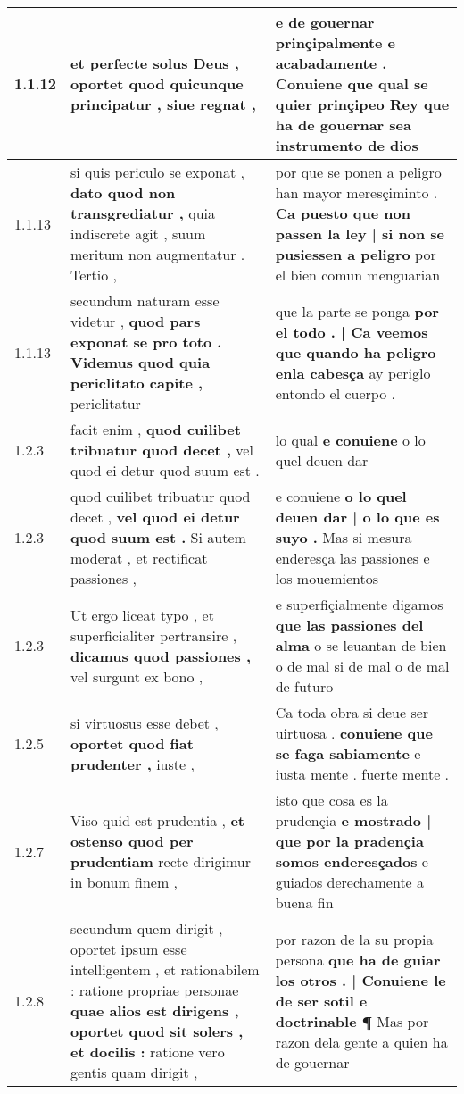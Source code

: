 \begin{tabular}{|p{1cm}|p{6.5cm}|p{6.5cm}|}
1.1.12 & et perfecte solus Deus , \textbf{ oportet quod quicunque principatur , } siue regnat , & e de gouernar prinçipalmente e acabadamente . \textbf{ Conuiene que qual se quier prinçipeo Rey } que ha de gouernar sea instrumento de dios \\\hline
1.1.13 & si quis periculo se exponat , \textbf{ dato quod non transgrediatur , } quia indiscrete agit , suum meritum non augmentatur . Tertio , & por que se ponen a peligro han mayor meresçiminto . \textbf{ Ca puesto que non passen la ley | si non se pusiessen a peligro } por el bien comun menguarian \\\hline
1.1.13 & secundum naturam esse videtur , \textbf{ quod pars exponat se pro toto . Videmus quod quia periclitato capite , } periclitatur & que la parte se ponga \textbf{ por el todo . | Ca veemos que quando ha peligro enla cabesça } ay periglo entondo el cuerpo . \\\hline
1.2.3 & facit enim , \textbf{ quod cuilibet tribuatur quod decet , } vel quod ei detur quod suum est . & lo qual \textbf{ e conuiene } o lo quel deuen dar \\\hline
1.2.3 & quod cuilibet tribuatur quod decet , \textbf{ vel quod ei detur quod suum est . } Si autem moderat , et rectificat passiones , & e conuiene \textbf{ o lo quel deuen dar | o lo que es suyo . } Mas si mesura enderesça las passiones e los mouemientos \\\hline
1.2.3 & Ut ergo liceat typo , et superficialiter pertransire , \textbf{ dicamus quod passiones , } vel surgunt ex bono , & e superfiçialmente digamos \textbf{ que las passiones del alma } o se leuantan de bien o de mal si de mal o de mal de futuro \\\hline
1.2.5 & si virtuosus esse debet , \textbf{ oportet quod fiat prudenter , } iuste , & Ca toda obra si deue ser uirtuosa . \textbf{ conuiene que se faga sabiamente } e iusta mente . fuerte mente . \\\hline
1.2.7 & Viso quid est prudentia , \textbf{ et ostenso quod per prudentiam } recte dirigimur in bonum finem , & isto que cosa es la prudençia \textbf{ e mostrado | que por la pradençia somos enderesçados } e guiados derechamente a buena fin \\\hline
1.2.8 & secundum quem dirigit , oportet ipsum esse intelligentem , et rationabilem : ratione propriae personae \textbf{ quae alios est dirigens , oportet quod sit solers , et docilis : } ratione vero gentis quam dirigit , & por razon de la su propia persona \textbf{ que ha de guiar los otros . | Conuiene le de ser sotil e doctrinable ¶ } Mas por razon dela gente a quien ha de gouernar \\\hline

\end{tabular}
